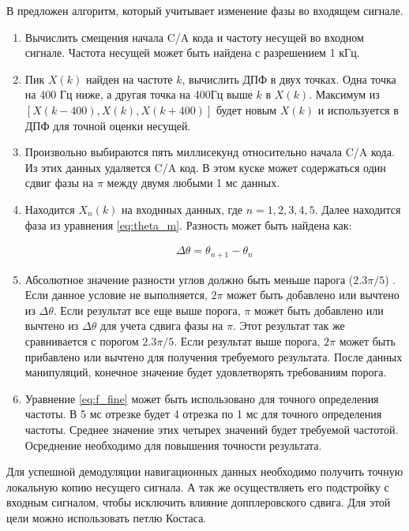В \cite{tsui} предложен алгоритм, который учитывает изменение фазы во входящем сигнале.
\begin{enumerate}
\renewcommand{\labelenumi}{\arabic{enumi}.}
    \item Вычислить смещения начала C/A кода и частоту несущей во входном сигнале. Частота несущей может быть найдена с разрешением 1 кГц.
    \item Пик ${X(k)}$ найден на частоте ${k}$, вычислить ДПФ в двух точках. Одна точка на 400 Гц ниже, а другая точка на 400Гц выше ${k}$ в ${X(k)}$.
    	  Максимум из ${[X(k-400), X(k), X(k+400)]}$ будет новым ${X(k)}$ и используется в ДПФ для точной оценки несущей.
    \item Произвольно выбираются пять миллисекунд относительно начала C/A кода. Из этих данных удаляется C/A код. В этом куске может
          содержаться один сдвиг фазы на ${\pi}$ между двумя любыми 1 мс данных.
    \item Находится ${X_n(k)}$ на входнных данных, где ${n = 1, 2, 3, 4, 5}$. Далее находится фаза из уравнения \ref{eq:theta_m}. Разность может
          быть найдена как:

	\begin{eqnarray}
	\Delta{\theta} = \theta_{n+1} - \theta_n
	\label{eq:Delta_phi}
	\end{eqnarray}

    \item Абсолютное значение разности углов должно быть меньше парога (${2.3\pi/5}$) \cite{tsui}. Если данное условие не выполняется, ${2\pi}$
          может быть добавлено или вычтено из ${\Delta{\theta}}$. Если результат все еще выше порога, ${\pi}$ может быть добавлено или вычтено
	  из ${\Delta{\theta}}$ для учета сдвига фазы на ${\pi}$. Этот результат так же сравнивается с порогом ${2.3\pi/5}$. Если результат выше
	  порога, ${2\pi}$ может быть прибавлено или вычтено для получения требуемого результата. После данных манипуляций, конечное значение будет
	  удовлетворять требованиям порога.
    \item Уравнение \ref{eq:f_fine} может быть использовано для точного определения частоты. В 5 мс отрезке будет 4 отрезка по 1 мс для точного
          определения частоты. Среднее значение этих четырех значений будет требуемой частотой. Осреднение необходимо для повышения точности результата.
\end{enumerate}


Для успешной демодуляции навигационных данных необходимо получить точную локальную копию несущего сигнала. А
так же осуществляеть его подстройку с входным сигналом, чтобы исключить влияние допплеровского сдвига. Для этой 
цели можно использовать петлю Костаса.

